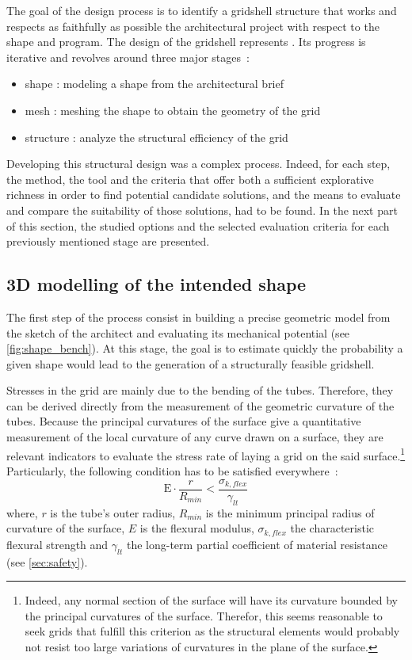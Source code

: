 The goal of the design process is to identify a gridshell structure that works and respects as faithfully as possible the architectural project with respect to the shape and program. The design of the gridshell represents . Its progress is iterative and revolves around three major stages~: 
\begin{itemize}
\item shape : modeling a shape from the architectural brief
\item mesh : meshing the shape to obtain the geometry of the grid
\item structure : analyze the structural efficiency of the grid
\end{itemize}
Developing this structural design was a complex process. Indeed, for each step, the method, the tool and the criteria that offer both a sufficient explorative richness in order to find potential candidate solutions, and the means to evaluate and compare the suitability of those solutions, had to be found. In the next part of this section, the studied options and the selected evaluation criteria for each previously mentioned stage are presented.

\subsection{3D modelling of the intended shape}
The first step of the process consist in building a precise geometric model from the sketch of the architect and evaluating its mechanical potential (see \cref{fig:shape_bench}). At this stage, the goal is to estimate quickly the probability a given shape would lead to the generation of a structurally feasible gridshell.

Stresses in the grid are mainly due to the bending of the tubes. Therefore, they can be derived directly from the measurement of the geometric curvature of the tubes. Because the principal curvatures of the surface give a quantitative measurement of the local curvature of any curve drawn on a surface, they are relevant indicators to evaluate the stress rate of laying a grid on the said surface.\footnote{Indeed, any normal section of the surface will have its curvature bounded by the principal curvatures of the surface. Therefor, this seems reasonable to seek grids that fulfill this criterion as the structural elements would probably not resist too large variations of curvatures in the plane of the surface.} Particularly, the following condition has to be satisfied everywhere~: 
\begin{equation}
	\mathrm{E} \cdot \frac{r}{R_{min}} < \frac{\sigma_{k,flex}}{\gamma_{lt}} 
	\label{eq:crit_1}
\end{equation}
where, $r$ is the tube’s outer radius, $R_{min}$ is the minimum principal radius of curvature of the surface, $E$ is the flexural modulus, $\sigma_{k,flex}$ the characteristic flexural strength and $\gamma_{lt}$ the long-term partial coefficient of material resistance (see \cref{sec:safety}). 

